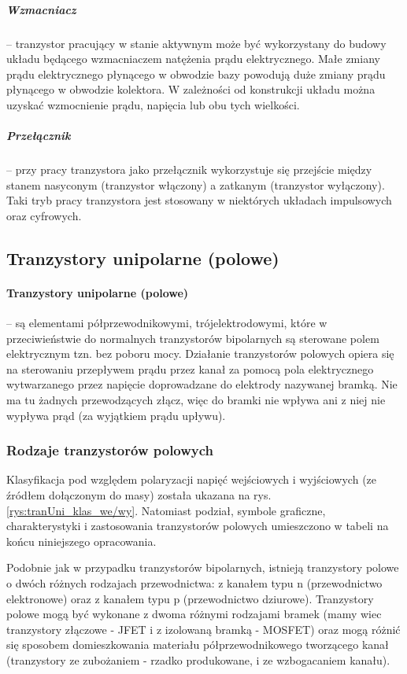 \documentclass[a4paper,twoside]{report}
\begin{document}
\subparagraph{Wzmacniacz} – tranzystor pracujący w stanie aktywnym może być wykorzystany do budowy układu będącego wzmacniaczem natężenia prądu elektrycznego. Małe zmiany prądu elektrycznego płynącego w obwodzie bazy powodują duże zmiany prądu płynącego w obwodzie kolektora. W zależności od konstrukcji układu można uzyskać wzmocnienie prądu, napięcia lub obu tych wielkości.


\subparagraph{Przełącznik} – przy pracy tranzystora jako przełącznik wykorzystuje się przejście między stanem nasyconym (tranzystor włączony) a zatkanym (tranzystor wyłączony). Taki tryb pracy tranzystora jest stosowany w niektórych układach impulsowych oraz cyfrowych.

\subsection{Tranzystory unipolarne (polowe)}

\paragraph{Tranzystory unipolarne (polowe)} – są elementami półprzewodnikowymi, trójelektrodowymi, które w przeciwieństwie do normalnych tranzystorów bipolarnych są sterowane polem elektrycznym tzn. bez poboru mocy. Działanie tranzystorów polowych opiera się na sterowaniu przepływem prądu przez kanał za pomocą pola elektrycznego wytwarzanego przez napięcie doprowadzane do elektrody nazywanej bramką. Nie ma tu żadnych przewodzących złącz, więc do bramki nie wpływa ani z niej nie wypływa prąd (za wyjątkiem prądu upływu).  

\subsubsection{Rodzaje tranzystorów polowych}
Klasyfikacja pod względem polaryzacji napięć wejściowych i wyjściowych (ze źródłem dołączonym do masy) została ukazana na rys. \ref{rys:tranUni_klas_we/wy}. Natomiast podział, symbole graficzne, charakterystyki i zastosowania tranzystorów polowych umieszczono w tabeli na końcu niniejszego opracowania.

Podobnie jak w przypadku tranzystorów bipolarnych, istnieją tranzystory polowe o dwóch różnych rodzajach przewodnictwa: z kanałem typu n (przewodnictwo elektronowe) oraz z kanałem typu p (przewodnictwo dziurowe). Tranzystory polowe mogą być wykonane z dwoma różnymi rodzajami bramek (mamy wiec tranzystory złączowe - JFET i z izolowaną bramką - MOSFET) oraz mogą różnić się sposobem domieszkowania materiału półprzewodnikowego tworzącego kanał (tranzystory ze zubożaniem - rzadko produkowane, i ze wzbogacaniem kanału).
\end{document}
